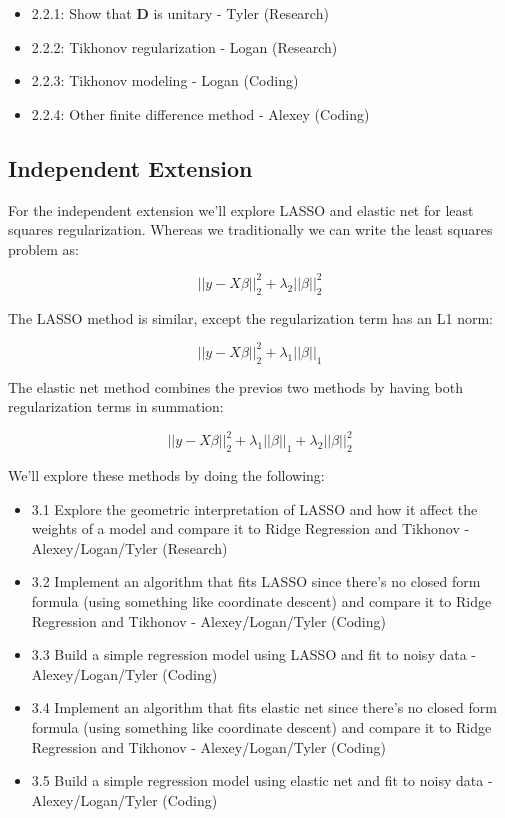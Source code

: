\documentclass{article}
\begin{document}
    \begin{itemize}
        \item 2.2.1: Show that $\textbf{D}$ is unitary - Tyler (Research)
        \item 2.2.2: Tikhonov regularization - Logan (Research)
        \item 2.2.3: Tikhonov modeling - Logan (Coding)
        \item 2.2.4: Other finite difference method - Alexey (Coding)
    \end{itemize}

    \subsection{Independent Extension}

    For the independent extension we'll explore LASSO and elastic net for least squares regularization. Whereas we traditionally we can write the least squares problem as:

    \begin{equation*}
        ||y-X\beta||^{2}_{2} + \lambda_2 ||\beta||_{2}^{2}
    \end{equation*}

    The LASSO method is similar, except the regularization term has an L1 norm:

    \begin{equation*}
        ||y-X\beta||^{2}_{2} + \lambda_1 ||\beta||_{1}
    \end{equation*}

    The elastic net method combines the previos two methods by having both regularization terms in summation:

    \begin{equation*}
        ||y-X\beta||^{2}_{2} + \lambda_1 ||\beta||_{1} + \lambda_2 ||\beta||_{2}^{2}
    \end{equation*}

    We'll explore these methods by doing the following:

    \begin{itemize}
        \item 3.1 Explore the geometric interpretation of LASSO and how it affect the weights of a model and compare it to Ridge Regression and Tikhonov - Alexey/Logan/Tyler (Research)
        \item 3.2 Implement an algorithm that fits LASSO since there's no closed form formula (using something like coordinate descent) and compare it to Ridge Regression and Tikhonov - Alexey/Logan/Tyler (Coding)
        \item 3.3 Build a simple regression model using LASSO and fit to noisy data  - Alexey/Logan/Tyler (Coding)
        \item 3.4 Implement an algorithm that fits elastic net since there's no closed form formula (using something like coordinate descent) and compare it to Ridge Regression and Tikhonov - Alexey/Logan/Tyler (Coding)
        \item 3.5 Build a simple regression model using elastic net and fit to noisy data  - Alexey/Logan/Tyler (Coding)
    \end{itemize}
\end{document}

